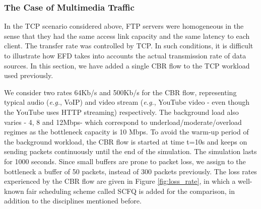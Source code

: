 \documentclass[preprint,12pt]{elsarticle}
\begin{document}




\subsubsection{The Case of Multimedia Traffic}\label{sec:multi_media}
In the TCP scenario considered above, FTP servers were homogeneous in the sense that they had the same access link capacity and the same latency to each client. The transfer rate was controlled by TCP. In such conditions, it is difficult to illustrate how EFD takes into accounts the actual transmission rate of data sources. In this section, we have added a single CBR flow to the TCP workload used previously.%

We consider two  rates 64Kb/s and 500Kb/s for the CBR flow, representing typical audio (\textit{e.g.}, VoIP) and video stream (\textit{e.g.}, YouTube video - even though the YouTube uses HTTP streaming)  respectively. The background load also varies - 4, 8 and 12Mbps-  which correspond to underload/moderate/overload regimes as the bottleneck capacity is 10 Mbps. To avoid the warm-up period of the background workload, the CBR flow is started at time t=10s and keeps on sending packets continuously until the end of the simulation. The simulation lasts for 1000 seconds. Since small buffers are prone to packet loss, we assign to the bottleneck a buffer of 50 packets, instead of 300 packets previously. The loss rates experienced by the CBR flow are given in Figure \ref{fig:loss_rate}, in which a well-known fair scheduling scheme called SCFQ \cite{Golestani94SCFQ} is added for the comparison, in addition to the disciplines mentioned before.
\end{document}

